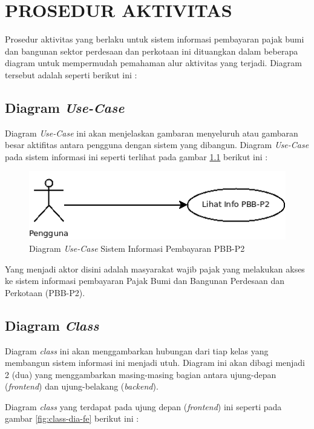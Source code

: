 \chapter{PROSEDUR AKTIVITAS}

Prosedur aktivitas yang berlaku untuk sistem informasi pembayaran pajak bumi dan bangunan sektor perdesaan dan perkotaan ini dituangkan dalam beberapa diagram untuk mempermudah pemahaman alur aktivitas yang terjadi. Diagram tersebut adalah seperti berikut ini :

\section{Diagram \textit{Use-Case}}

Diagram \textit{Use-Case} ini akan menjelaskan gambaran menyeluruh atau gambaran besar aktifitas antara pengguna dengan sistem yang dibangun. Diagram \textit{Use-Case} pada sistem informasi ini seperti terlihat pada gambar \ref{fig:use-case} berikut ini :

\begin{figure}[H]
	\centering
	\includegraphics[width=1\textwidth]{./resources/uml/use-case-diag}
	\caption{Diagram \textit{Use-Case} Sistem Informasi Pembayaran PBB-P2}
	\label{fig:use-case}
\end{figure}

Yang menjadi aktor disini adalah masyarakat wajib pajak yang melakukan akses ke sistem informasi pembayaran Pajak Bumi dan Bangunan Perdesaan dan Perkotaan (PBB-P2).

\section{Diagram \textit{Class}}

Diagram \textit{class} ini akan menggambarkan hubungan dari tiap kelas yang membangun sistem informasi ini menjadi utuh. Diagram ini akan dibagi menjadi 2 (dua) yang menggambarkan masing-masing bagian antara ujung-depan (\textit{frontend}) dan ujung-belakang (\textit{backend}).

Diagram \textit{class} yang terdapat pada ujung depan (\textit{frontend}) ini seperti pada gambar \ref{fig:class-dia-fe} berikut ini :


